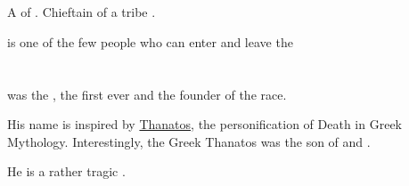 \section{\Najarod}
\index{\Najarod}
A \resphan{} of \Baelzerach. 
Chieftain of a tribe  \QuessanthIshnaruchaefir. 

\Najarod{} is one of the few people who can enter and leave the 















\section[Thanatzil]{\Thanatzil}
\index{\Thanatzil}
\Thanatzil{} was the \banemessiah, the first \resphan{} ever and the founder of the \resphan{} race. 

His name is inspired by \href{http://en.wikipedia.org/wiki/Thanatos}{Thanatos}, the personification of Death in Greek Mythology. Interestingly, the Greek Thanatos was the son of \Erebos{} and \Nyx. 

He is a rather tragic . 

